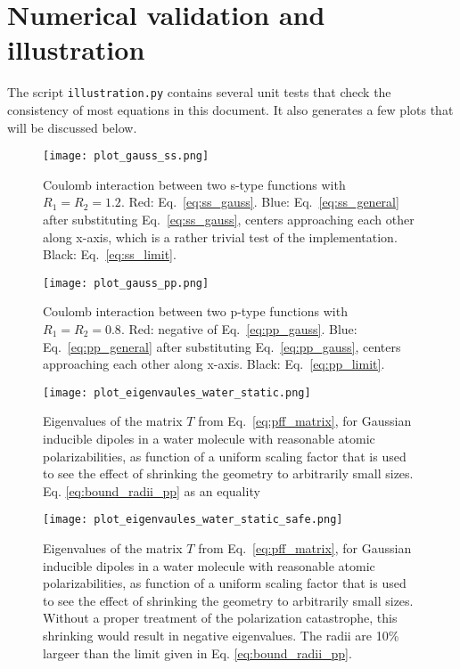 \documentclass[a4paper,12pt,parskip=half]{scrartcl}
\begin{document}
\section{Numerical validation and illustration}

The script \texttt{illustration.py} contains several unit tests that check the consistency of most equations in this document. It also generates a few plots that will be discussed below.

\begin{figure}
    \centering
    \texttt{[image: plot\_gauss\_ss.png]}
    \caption{Coulomb interaction between two s-type functions with $R_1=R_2=1.2$. Red: Eq.\ \eqref{eq:ss_gauss}. Blue: Eq.\ \eqref{eq:ss_general} after substituting Eq.\ \eqref{eq:ss_gauss}, centers approaching each other along x-axis, which is a rather trivial test of the implementation. Black: Eq.\ \eqref{eq:ss_limit}.}
    \label{fig:gauss_ss}
\end{figure}

\begin{figure}
    \centering
    \texttt{[image: plot\_gauss\_pp.png]}
    \caption{Coulomb interaction between two p-type functions with $R_1=R_2=0.8$. Red: negative of Eq.\ \eqref{eq:pp_gauss}. Blue: Eq.\ \eqref{eq:pp_general} after substituting Eq.\ \eqref{eq:pp_gauss}, centers approaching each other along x-axis. Black: Eq.\ \eqref{eq:pp_limit}.}
    \label{fig:gauss_pp}
\end{figure}

\begin{figure}
    \centering
    \texttt{[image: plot\_eigenvaules\_water\_static.png]}
    \caption{Eigenvalues of the matrix $T$ from Eq.\ \eqref{eq:pff_matrix}, for Gaussian inducible dipoles in a water molecule with reasonable atomic polarizabilities, as function of a uniform scaling factor that is used to see the effect of shrinking the geometry to arbitrarily small sizes. Eq. \eqref{eq:bound_radii_pp} as an equality}
    \label{fig:eigenvalues_water_static}
\end{figure}

\begin{figure}
    \centering
    \texttt{[image: plot\_eigenvaules\_water\_static\_safe.png]}
    \caption{Eigenvalues of the matrix $T$ from Eq.\ \eqref{eq:pff_matrix}, for Gaussian inducible dipoles in a water molecule with reasonable atomic polarizabilities, as function of a uniform scaling factor that is used to see the effect of shrinking the geometry to arbitrarily small sizes. Without a proper treatment of the polarization catastrophe, this shrinking would result in negative eigenvalues. The radii are 10\% largeer than the limit given in Eq. \eqref{eq:bound_radii_pp}.}
    \label{fig:eigenvalues_water_static_safe}
\end{figure}
\end{document}

